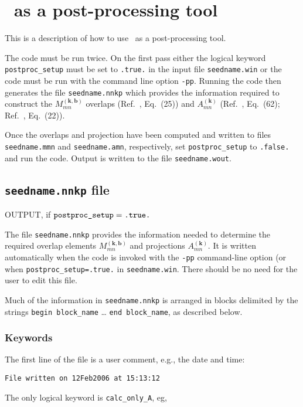 \chapter{\wannier\ as a post-processing tool} \label{ch:wann-pp}

This is a description of how to use \wannier\ as a
post-processing tool. 

The code must be run twice. On the first pass either the logical
keyword \verb#postproc_setup# must be set to \verb#.true.# in the
input file \verb#seedname.win# or the code must be run with the
command line option \verb#-pp#.  Running the code then generates the
file \verb#seedname.nnkp# which provides the information required to
construct the $M_{mn}^{(\mathbf{k,b})}$ overlaps
(Ref.~\cite{marzari-prb97}, Eq.~(25)) and $A_{mn}^{(\mathbf{k})}$
(Ref.~\cite{marzari-prb97}, Eq.~(62); Ref.~\cite{souza-prb01},
Eq.~(22)).

Once the overlaps and projection have been computed and written to
files \verb#seedname.mmn# and \verb#seedname.amn#, respectively,
set \verb#postproc_setup# to \verb#.false.# and run the code. Output is
written to the file \verb#seedname.wout#.


\section{{\tt seedname.nnkp} file}

OUTPUT, if $\verb#postproc_setup#=\verb#.true.#$

The file \verb#seedname.nnkp# provides the information needed to
determine the required overlap elements $M_{mn}^{(\mathbf{k,b})}$ and
projections $A_{mn}^{(\mathbf{k})}$. It is written automatically when
the code is invoked with the \verb#-pp# command-line option (or when
\verb#postproc_setup=.true.# in \verb#seedname.win#. There should be
no need for the user to edit this file.

Much of the information in \verb#seedname.nnkp# is arranged in blocks
delimited by the strings \verb#begin block_name# \ldots
\verb#end block_name#, as described below. 


\subsection{Keywords}
The first line of the file is a user comment, e.g., the date and time:

\verb#File written on 12Feb2006 at 15:13:12#

\noindent 
The only logical keyword is \verb#calc_only_A#, eg,


